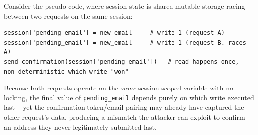 \documentclass[11pt]{article}
\begin{document}
\begin{causebox}
Consider the pseudo-code, where session state is shared mutable storage racing between two requests on the same session:
\begin{lstlisting}[style=code]
session['pending_email'] = new_email     # write 1 (request A)
session['pending_email'] = new_email     # write 1 (request B, races A)
send_confirmation(session['pending_email'])   # read happens once, non-deterministic which write "won"
\end{lstlisting}
Because both requests operate on the \emph{same} session-scoped variable with no locking, the final value of \texttt{pending\_email} depends purely on which write executed last -- yet the confirmation token/email pairing may already have captured the other request's data, producing a mismatch the attacker can exploit to confirm an address they never legitimately submitted last.
\end{causebox}

\end{document}

